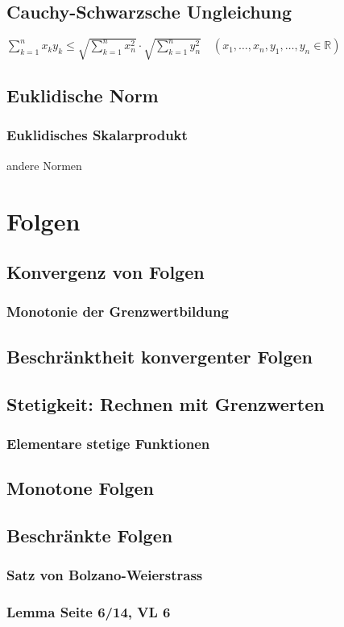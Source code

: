 \documentclass[10pt,a4paper^, twocolumn]{article}
\newcommand{\menge}{\mathbb} %
\begin{document}
\subsection{Cauchy-Schwarzsche Ungleichung}
$\sum\limits_{k=1}^n x_ky_k \leq \sqrt{\sum\limits_{k=1}^n x_n^2} \cdot \sqrt{\sum\limits_{k=1}^n y_n^2} \quad (x_1,\dots,x_n,y_1,\dots,y_n \in \menge{R})$
\subsection{Euklidische Norm}
\subsubsection{Euklidisches Skalarprodukt}
andere Normen

\section{Folgen}
\subsection{Konvergenz von Folgen}
\subsubsection{Monotonie der Grenzwertbildung}
\subsection{Beschränktheit konvergenter Folgen}
\subsection{Stetigkeit: Rechnen mit Grenzwerten}
\subsubsection{Elementare stetige Funktionen}
\subsection{Monotone Folgen}
\subsection{Beschränkte Folgen}
\subsubsection{Satz von Bolzano-Weierstrass}
\subsubsection{Lemma Seite 6/14, VL 6}
\end{document}
